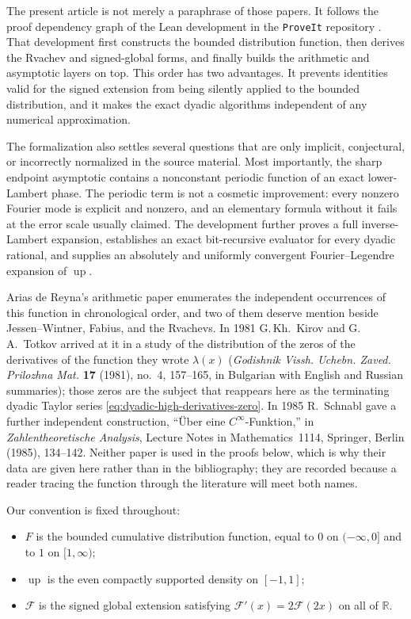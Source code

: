 \documentclass[11pt,oneside]{article}
\theoremstyle{definition}
\theoremstyle{remark}
\newcommand{\R}{\mathbb R}
\newcommand{\Up}{\operatorname{up}}
\begin{document}
The present article is not merely a paraphrase of those papers.  It follows the proof
dependency graph of the Lean development in the \texttt{ProveIt} repository
\cite{proveit}.  That development first constructs the bounded distribution function, then
derives the Rvachev and signed-global forms, and finally builds the arithmetic and asymptotic
layers on top.  This order has two advantages.  It prevents identities valid for the signed
extension from being silently applied to the bounded distribution, and it makes the exact
dyadic algorithms independent of any numerical approximation.

The formalization also settles several questions that are only implicit, conjectural, or
incorrectly normalized in the source material.  Most importantly, the sharp endpoint
asymptotic contains a nonconstant periodic function of an exact lower-Lambert phase.  The
periodic term is not a cosmetic improvement: every nonzero Fourier mode is explicit and
nonzero, and an elementary formula without it fails at the error scale usually claimed.
The development further proves a full inverse-Lambert expansion, establishes an exact
bit-recursive evaluator for every dyadic rational, and supplies an absolutely and uniformly
convergent Fourier--Legendre expansion of $\Up$.

Arias de Reyna's arithmetic paper \cite{arias2018} enumerates the independent occurrences of
this function in chronological order, and two of them deserve mention beside Jessen--Wintner,
Fabius, and the Rvachevs.  In 1981 G.\,Kh.~Kirov and G.\,A.~Totkov arrived at it in a study
of the distribution of the zeros of the derivatives of the function they wrote $\lambda(x)$
(\emph{Godishnik Vissh. Uchebn. Zaved. Prilozhna Mat.} \textbf{17} (1981), no.~4, 157--165,
in Bulgarian with English and Russian summaries); those zeros are the subject that reappears
here as the terminating dyadic Taylor series \eqref{eq:dyadic-high-derivatives-zero}.  In
1985 R.~Schnabl gave a further independent construction, ``Über eine $C^\infty$-Funktion,''
in \emph{Zahlentheoretische Analysis}, Lecture Notes in Mathematics~1114, Springer, Berlin
(1985), 134--142.  Neither paper is used in the proofs below, which is why their data are
given here rather than in the bibliography; they are recorded because a reader tracing the
function through the literature will meet both names.

Our convention is fixed throughout:

\begin{itemize}
\item $F$ is the bounded cumulative distribution function, equal to $0$ on
      $(-\infty,0]$ and to $1$ on $[1,\infty)$;
\item $\Up$ is the even compactly supported density on $[-1,1]$;
\item $\mathcal F$ is the signed global extension satisfying
      $\mathcal F'(x)=2\mathcal F(2x)$ on all of $\R$.
\end{itemize}
\end{document}
